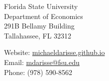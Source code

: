 \documentclass[letterpaper, 11pt]{article}
\begin{document}
\begin{center} \end{center} 

\bigskip
\begin{minipage}[t]{0.495\textwidth}
  Florida State University \\
  Department of Economics \\
  291B Bellamy Building \\
  Tallahassee, FL 32312
\end{minipage}
\begin{minipage}[t]{0.495\textwidth}
  Website: \href{https://michaeldarisse.github.io}{michaeldarisse.github.io} \\
  Email: \href{mailto:mdarisse@fsu.edu}{mdarisse@fsu.edu} \\
  Phone: (978) 590-8562
\end{minipage}

\setlength{\tabcolsep}{8pt}
\end{document}
